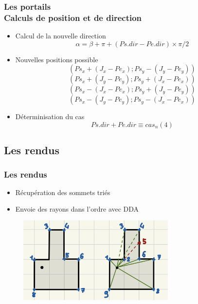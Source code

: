 \documentclass{beamer}
\begin{document}
\begin{frame}
    \frametitle{Les portails \\
                \small Calculs de position et de direction}
    \begin{block}{}
        \begin{itemize}
            \item Calcul de la nouvelle direction
            $$\alpha = \beta + \pi + (Ps.dir - Pe.dir) \times \pi / 2$$
        \end{itemize}
    \end{block}
    \begin{block}{}
        \begin{itemize}
            \item Nouvelles positions possible
            $$(Ps_x + (J_x - Pe_x) ; Ps_y - (J_y - Pe_y))$$
            $$(Ps_x + (J_y - Pe_y) ; Ps_y + (J_x - Pe_x))$$
            $$(Ps_x - (J_x - Pe_x) ; Ps_y + (J_y - Pe_y))$$
            $$(Ps_x - (J_y - Pe_y) ; Ps_y - (J_x - Pe_x))$$
        \end{itemize}
        \begin{itemize}
            \item Déterminisation du cas 
            $$Ps.dir + Pe.dir \equiv cas_n (4)$$
        \end{itemize}
        
    \end{block}
\end{frame}

\subsection{Les rendus}

\begin{frame}
    \frametitle{Les rendus}
    \begin{block}{}
        \begin{itemize}
            \item Récupération des sommets triés
            \item Envoie des rayons dans l'ordre avec DDA
        \end{itemize}
    \end{block}
    \begin{figure}
        \centering
        \includegraphics[width=0.7\textwidth]{images/envoie-rayon-ordre.jpeg}
    \end{figure}
\end{frame}
\end{document}
